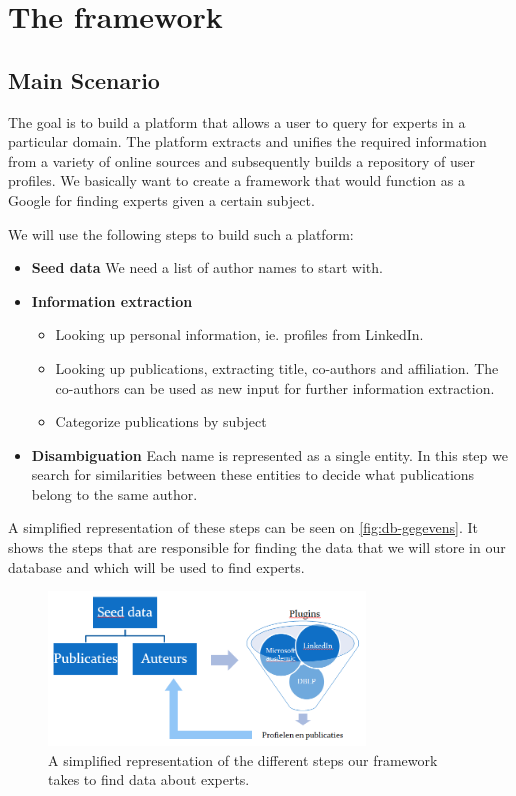 \chapter{The framework}

\section{Main Scenario}

The goal is to build a platform that allows a user to query for experts in a particular domain. The platform extracts and unifies the required information from a variety of online sources and subsequently builds a repository of user profiles. We basically want to create a framework that would function as a Google for finding experts given a certain subject.

We will use the following steps to build such a platform:


\begin{itemize}
	\item \textbf{Seed data} We need a list of author names to start with.
	\item \textbf{Information extraction}
		\begin{itemize}
			\item Looking up personal information, ie. profiles from LinkedIn.
			\item Looking up publications, extracting title, co-authors and affiliation. The co-authors can be used as new input for further information extraction.
			\item Categorize publications by subject
		\end{itemize}
	\item \textbf{Disambiguation} Each name is represented as a single entity. In this step we search for similarities between these entities to decide what publications belong to the same author.
\end{itemize}

A simplified representation of these steps can be seen on \autoref{fig:db-gegevens}. It shows the steps that are responsible for finding the data that we will store in our database and which will be used to find experts.

\begin{figure}[htbp]
	\centering
		\includegraphics[width=0.75\textwidth]{fig/database-gegevens.png}
	\caption{A simplified representation of the different steps our framework takes to find data about experts.}
	\label{fig:db-gegevens}
\end{figure}

